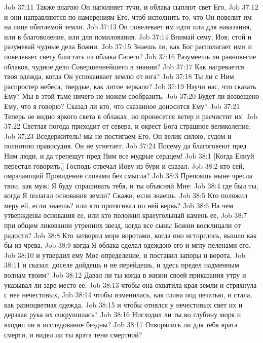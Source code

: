 \vs Job 37:11 Также влагою Он наполняет тучи, и облака сыплют свет Его,
\vs Job 37:12 и они направляются по намерениям Его, чтоб исполнить то, что Он повелит им на лице обитаемой земли.
\vs Job 37:13 Он повелевает им идти или для наказания, или в благоволение, или для помилования.
\vs Job 37:14 Внимай сему, Иов; стой и разумевай чудные дела Божии.
\vs Job 37:15 Знаешь ли, как Бог располагает ими и повелевает свету блистать из облака Своего?
\vs Job 37:16 Разумеешь ли равновесие облаков, чудное дело Совершеннейшего в знании?
\vs Job 37:17 Как нагревается твоя одежда, когда Он успокаивает землю от юга?
\vs Job 37:18 Ты ли с Ним распростер небеса, твердые, как литое зеркало?
\vs Job 37:19 Научи нас, что сказать Ему? Мы в этой тьме ничего не можем сообразить.
\vs Job 37:20 Будет ли возвещено Ему, что я говорю? Сказал ли кто, что сказанное доносится Ему?
\vs Job 37:21 Теперь не видно яркого света в облаках, но пронесется ветер и расчистит их.
\vs Job 37:22 Светлая погода приходит от севера, и окрест Бога страшное великолепие.
\vs Job 37:23 Вседержитель! мы не постигаем Его. Он велик силою, судом и полнотою правосудия. Он  не угнетает.
\vs Job 37:24 Посему да благоговеют пред Ним люди, и да трепещут пред Ним все мудрые сердцем!
\vs Job 38:1 [Когда Елиуй перестал говорить,] Господь отвечал Иову из бури и сказал:
\vs Job 38:2 кто сей, омрачающий Провидение словами без смысла?
\vs Job 38:3 Препояшь ныне чресла твои, как муж: Я буду спрашивать тебя, и ты объясняй Мне:
\vs Job 38:4 где был ты, когда Я полагал основания земли? Скажи, если знаешь.
\vs Job 38:5 Кто положил меру ей, если знаешь? или кто протягивал по ней вервь?
\vs Job 38:6 На чем утверждены основания ее, или кто положил краеугольный камень ее,
\vs Job 38:7 при общем ликовании утренних звезд, когда все сыны Божии восклицали от радости?
\vs Job 38:8 Кто затворил море воротами, когда оно исторглось, вышло как бы из чрева,
\vs Job 38:9 когда Я облака сделал одеждою его и мглу пеленами его,
\vs Job 38:10 и утвердил ему Мое определение, и поставил запоры и ворота,
\vs Job 38:11 и сказал: доселе дойдешь и не перейдешь, и здесь предел надменным волнам твоим?
\vs Job 38:12 Давал ли ты когда в жизни своей приказания утру и указывал ли заре место ее,
\vs Job 38:13 чтобы она охватила края земли и стряхнула с нее нечестивых,
\vs Job 38:14 чтобы  изменилась, как глина под печатью, и стала, как разноцветная одежда,
\vs Job 38:15 и чтобы отнялся у нечестивых свет их и дерзкая рука их сокрушилась?
\vs Job 38:16 Нисходил ли ты во глубину моря и входил ли в исследование бездны?
\vs Job 38:17 Отворялись ли для тебя врата смерти, и видел ли ты врата тени смертной?
